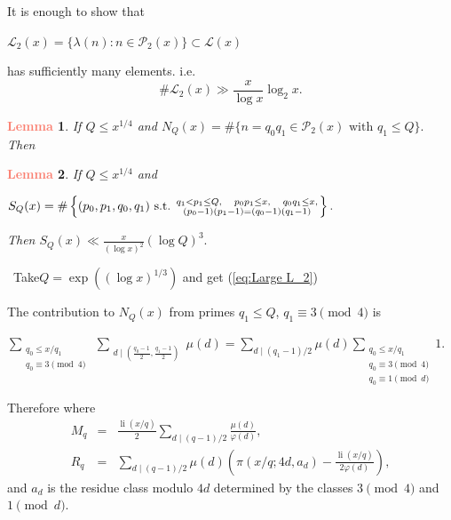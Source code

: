 \documentclass[landscape]{powersem} %
\newtheorem{lemma}{\textcolor{Salmon}{Lemma}}
\newcommand{\li}{\operatorname{li}}
\newcommand{\heading}[1]{%
 \begin{center}
  \large\bf
  \shadowbox{{\textcolor{conceptcolor}{#1}}}%
 \end{center}
 \vspace{1ex minus 1ex}}
\begin{document}
\begin{slide}
It is enough to show that
\centerline{$\displaystyle{
\mathcal{L}_2(x)=\{\lambda(n):n\in{\mathcal P}
_2(x)\}\subset\mathcal{L}(x)
}$}
has sufficiently many elements. i.e.\pause
\begin{equation}
\label{eq:Large L_2} \#\mathcal{L}_2(x) \gg \frac{x}{\log x}\log_2
x.
\end{equation}\pause

\begin{lemma}
\label{uno} If $Q\leq x^{1/4}$ and
{$\displaystyle{N_Q(x)=\#\{n = q_0q_1\in {\mathcal P}_2(x) \text{ with }q_1 \leq Q\}}.$}\pause
Then
\quad {}
\end{lemma}\pause
\begin{lemma}
\label{due} If $Q\leq x^{1/4}$ and
\centerline{$\displaystyle{S_Q(x)=\#\left\{ (p_0,p_1,q_0,q_1)\ \text{s.t.}\
\genfrac{}{}{0pt}{1}{q_1<p_1\leq Q,\quad p_0p_1\leq x, \quad q_0q_1\leq x,}
{(p_0-1)(p_1-1)=(q_0-1)(q_1-1)}\right\}.
}$}\pause
Then\quad\qquad
{$\displaystyle{S_Q(x)\ll \frac x{(\log x)^2}(\log Q)^3.
}$}\pause
\end{lemma}
\centerline{}\pause
\ \hfill Take\quad $Q=\exp\left((\log
x)^{1/3}\right)$ and get (\ref{eq:Large L_2})
\end{slide}

\begin{slide}

\heading{Proof of Lemma \ref{uno}}
The contribution to $N_Q(x)$ from primes $q_1\le Q$,
$q_1\equiv3 \pmod4$ is
 \centerline{$\displaystyle{
\sum_{\substack{q_0\leq x/q_1\\ q_0\equiv3\pmod4}}
~\sum_{\substack{d\mid(\frac {q_0-1}{2},\frac {q_1-1}{2})}}\mu(d)
=\sum_{d\mid (q_1-1)/2}\mu(d) \sum_{\substack{q_0\le
x/q_1\\q_0\equiv3\pmod4\\q_0\equiv1\pmod d}}1.
}$}\pause
Therefore
\qquad{}\pause
where
\begin{eqnarray*}
M_q &=&\frac{\li(x/q)}{2}
\sum_{d\mid (q-1)/2}\frac{\mu(d)}{\varphi(d)},\\
R_q &=& \sum_{d\mid
(q-1)/2}\mu(d)\left(\pi(x/q;4d,a_d)-\frac{\li(x/q)}{2\varphi(d)}\right),
\end{eqnarray*}\pause\vspace{-3mm}
{\scriptsize{and  $a_d$ is the residue class modulo $4d$ determined by the
classes $3\pmod 4$ and $1\pmod d$.}}

\end{slide}
\end{document}
